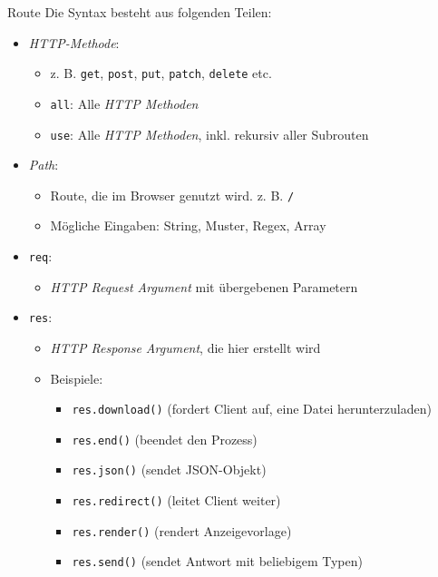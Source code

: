 \begin{defi}{Route}
    Die Syntax besteht aus folgenden Teilen:
    \begin{itemize}
        \item \emph{HTTP-Methode}:
              \begin{itemize}
                  \item z. B. \texttt{get}, \texttt{post}, \texttt{put}, \texttt{patch}, \texttt{delete} etc.
                  \item \texttt{all}: Alle \emph{HTTP Methoden}
                  \item \texttt{use}: Alle \emph{HTTP Methoden}, inkl. rekursiv aller Subrouten
              \end{itemize}
        \item \emph{Path}:
              \begin{itemize}
                  \item Route, die im Browser genutzt wird. z. B. \texttt{/}
                  \item Mögliche Eingaben: String, Muster, Regex, Array
              \end{itemize}
        \item \texttt{req}:
              \begin{itemize}
                  \item \emph{HTTP Request Argument} mit übergebenen Parametern
              \end{itemize}
        \item \texttt{res}:
              \begin{itemize}
                  \item \emph{HTTP Response Argument}, die hier erstellt wird
                  \item Beispiele:
                        \begin{itemize}
                            \item \texttt{res.download()} (fordert Client auf, eine Datei herunterzuladen)
                            \item \texttt{res.end()} (beendet den Prozess)
                            \item \texttt{res.json()} (sendet JSON-Objekt)
                            \item \texttt{res.redirect()} (leitet Client weiter)
                            \item \texttt{res.render()} (rendert Anzeigevorlage)
                            \item \texttt{res.send()} (sendet Antwort mit beliebigem Typen)

\end{itemize}
\end{itemize}
\end{itemize}
\end{defi}
